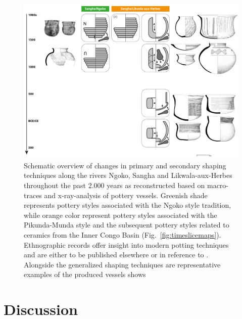 \documentclass[smallextended,natbib]{svjour3}       %
\begin{document}
\begin{figure}[!tb]
	\includegraphics[width=\textwidth]{Fig_ShapingTech_Schema.pdf}
	\caption{Schematic overview of changes in primary and secondary shaping techniques along the rivers Ngoko, Sangha and Likwala-aux-Herbes throughout the past 2.000 years as reconstructed based on macro-traces and x-ray-analysis of pottery vessels. Greenish shade represents pottery styles associated with the Ngoko style tradition, while orange color represent pottery styles associated with the Pikunda-Munda style and the subsequent pottery styles related to ceramics from the Inner Congo Basin (Fig.~\ref{fig:timeslicemaps}). Ethnographic records offer insight into modern potting techniques and are either to be published elsewhere \citep{Eggert.inVorb.} or in reference to \citet[25--35; {[1]}]{MpikaNgoma.1996}. Alongside the generalized shaping techniques are representative examples of the produced vessels shows \citep[cf.][]{Seidensticker.2021e,Seidensticker.2024}}
	\label{fig:schema}
\end{figure}

\section{Discussion}

\end{document}
